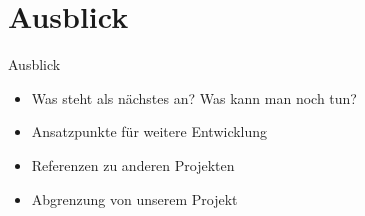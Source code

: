 
\section{Ausblick}

\begin{frame}{Ausblick}
    \begin{itemize}
        \item Was steht als nächstes an? Was kann man noch tun?
        \item Ansatzpunkte für weitere Entwicklung
        \item Referenzen zu anderen Projekten
        \item Abgrenzung von unserem Projekt
    \end{itemize}
\end{frame}

